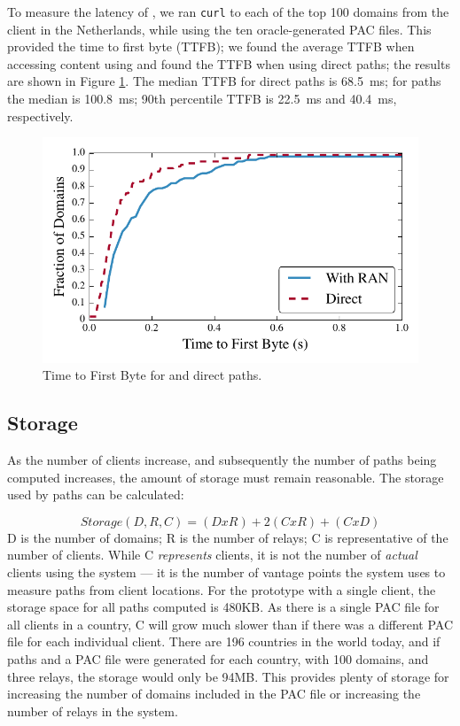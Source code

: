 To measure the latency of \system{}, we ran {\tt curl} to each of the 
top 100 domains from the client in the Netherlands, while using the ten
oracle-generated PAC files. This provided the time to first byte (TTFB); we 
found the average TTFB when accessing content using \system{} and 
found the TTFB when using direct paths; the results are shown in Figure \ref{fig:latency}.  
The median TTFB for direct paths is 68.5~ms; for \system{} paths the
median is 100.8~ms; 90th percentile TTFB is 22.5~ms and 40.4~ms, respectively.  


\begin{figure}[t]
\centering
\includegraphics[width=.5\textwidth]{latency}
\caption{Time to First Byte for \system{} and direct paths.}
\label{fig:latency}
\end{figure}


\subsection{Storage}

As the number of clients increase, and subsequently the number of paths being 
computed increases, the amount of storage must remain reasonable.  The storage 
used by paths can be calculated:

\[Storage(D,R,C) = (D x R) + 2(C x R) + (C x D) \]
\noindent
D is the number of domains; R is the number of relays; C is representative of the number of 
clients.  While C {\it represents} clients, it is not the number of {\it actual} clients using the 
system --- it is the number of vantage points the system uses to measure paths 
from client locations.  For the prototype with a single client, the storage space for all 
paths computed is 480KB.  As there is a single PAC file for all clients in 
a country, C will grow much slower than if there was a different PAC file for 
each individual client.  There are 196 countries in the world today, and if 
paths and a PAC file were generated for each country, with 100 domains, and 
three relays, the storage would only be 94MB.  This provides plenty of storage 
for increasing the number of domains included in the PAC file or increasing 
the number of relays in the system.

